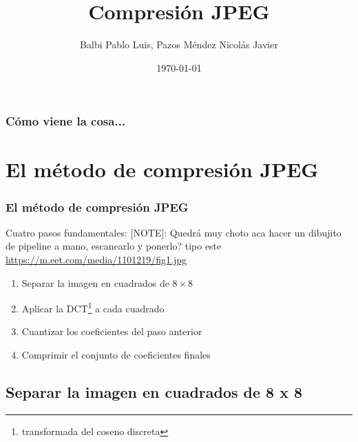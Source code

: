 \documentclass{beamer}
\begin{document}
\title{Compresión JPEG}
\author{Balbi Pablo Luis, Pazos Méndez Nicolás Javier}
\date{\today}

\begin{frame}
    \titlepage
\end{frame}

\begin{frame}
    \frametitle{Cómo viene la cosa...}
    \tableofcontents[hideallsubsections]
\end{frame}

\section{El método de compresión JPEG}
\begin{frame}
    \frametitle{El método de compresión JPEG}
        Cuatro pasos fundamentales:
        [NOTE]: Quedrá muy choto aca hacer un dibujito de pipeline a mano, escanearlo y ponerlo?
        tipo este \url{https://m.eet.com/media/1101219/fig1.jpg}
        \begin{enumerate}
            \item Separar la imagen en cuadrados de $8 \times 8$
            \item Aplicar la DCT\footnote{transformada del coseno discreta} a cada cuadrado
            \item Cuantizar los coeficientes del paso anterior
            \item Comprimir el conjunto de coeficientes finales
        \end{enumerate}

\end{frame}

\subsection{Separar la imagen en cuadrados de 8 x 8}
\end{document}
